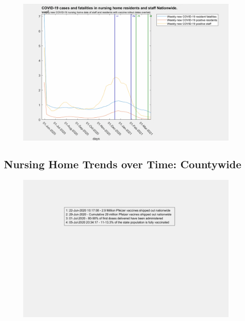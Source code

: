 \documentclass[twoside]{article}
\begin{document}
\begin{multicols}{2}
\begin{figure}[H]
	\includegraphics[width=\linewidth]{images/nationwide_nursing_home_with_vaccine.png}
	\caption{}
	\label{fig:images/nationwide_nursing_home_with_vaccineLabel}
\end{figure}

\subsection{Nursing Home Trends over Time: Countywide}

\begin{figure}[H]
	\includegraphics[width=\linewidth]{legends/new_vaccine_rollout_legend.png}
	\caption{}
	\label{fig:legends/new_vaccine_rollout_legendLabel}
\end{figure}



\end{multicols}
\end{document}
